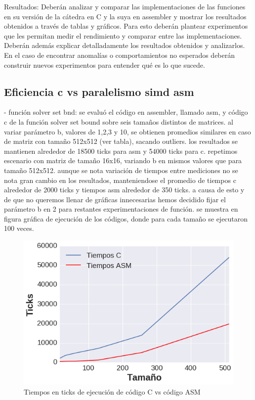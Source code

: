 Resultados: Deberán analizar y comparar las implementaciones de las funciones en su versión de la cátedra en C y la suya en assembler y mostrar los resultados obtenidos a través de tablas y gráficos. Para esto deberán plantear experimentos que les permitan medir el rendimiento y comparar entre las implementaciones. Deberán además explicar detalladamente los resultados obtenidos y analizarlos. En el caso de encontrar anomalías o comportamientos no esperados deberán construir nuevos experimentos para entender qué es lo que sucede.

\subsection{Eficiencia c vs paralelismo simd asm}
- función solver set bnd:
se evaluó el código en assembler, llamado asm, y código c de la función solver set bound sobre seis tamaños distintos de matrices. al variar parámetro b, valores de 1,2,3 y 10, se obtienen promedios similares en caso de matriz con tamaño 512x512 (ver tabla), sacando outliers. los resultados se mantienen alrededor de 18500 ticks para asm y 54000 ticks para c. 
repetimos escenario con matriz de tamaño 16x16, variando b en mismos valores que para tamaño 512x512. aunque se nota 
variación de tiempos entre mediciones no se nota gran cambio en los resultados, manteniendose el promedio de tiempos c alrededor de 2000 ticks y tiempos asm alrededor de 350 ticks.
a causa de esto y de que no queremos llenar de gráficas innecesarias hemos decidido fijar el parámetro b en 2 para restantes experimentaciones de función. 
se muestra en figura gráfica de ejecución de los códigos, donde para cada tamaño se ejecutaron 100 veces.
\begin{figure}[h]

\centering
\includegraphics[scale=0.6] {grafC}
  
 \caption{Tiempos en ticks de ejecución de código C vs código ASM}
\end{figure}



